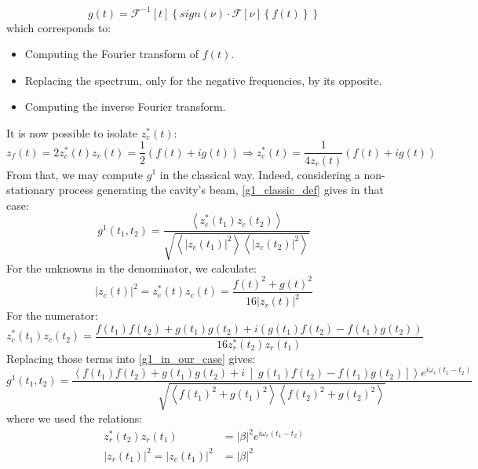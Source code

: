 \documentclass[11pt]{report}
\begin{document}
\begin{equation}
g(t) = \mathscr{F}^{-1}[t]\left\lbrace sign(\nu) \cdot \mathscr{F}[\nu]\left\lbrace f(t) \right\rbrace \right\rbrace
\end{equation}
which corresponds to:
\begin{itemize}
	\item Computing the Fourier transform of $f(t)$.
	\item Replacing the spectrum, only for the negative frequencies, by its opposite.
	\item Computing the inverse Fourier transform.
\end{itemize}
It is now possible to isolate $z_c^*(t)$:
\begin{equation}
\label{zf_def}
z_f(t) = 2z_c^*(t)z_r(t) = \frac{1}{2} (f(t) + ig(t)) \Rightarrow z_c^*(t) = \frac{1}{4z_r(t)} (f(t) + ig(t))
\end{equation}
From that, we may compute $g^1$ in the classical way. Indeed, considering a non-stationary process generating the cavity's beam, \eqref{g1_classic_def} gives in that case:
\begin{equation}
\label{g1_in_our_case}
g^1(t_1,t_2) = \frac{\left\langle z_c^*(t_1)z_c(t_2) \right\rangle}{\sqrt{\left\langle \vert z_c(t_1) \vert ^2 \right\rangle \left\langle \vert z_c(t_2) \vert ^2 \right\rangle}}
\end{equation}
For the unknowns in the denominator, we calculate:
\begin{equation}
\vert z_c(t) \vert ^2 = z_c^*(t)z_c(t) = \frac{f(t)^2 + g(t)^2}{16\vert z_r(t) \vert^2}
\end{equation}
For the numerator:
\begin{equation}
z_c^*(t_1)z_c(t_2) = \frac{f(t_1)f(t_2) + g(t_1)g(t_2) + i (g(t_1)f(t_2) - f(t_1)g(t_2))}{16z_r^*(t_2)z_r(t_1)}
\end{equation}
Replacing those terms into \eqref{g1_in_our_case} gives:
\begin{equation}
g^1(t_1,t_2) = \frac{\left\langle f(t_1)f(t_2) + g(t_1)g(t_2) + i \left]g(t_1)f(t_2) - f(t_1)g(t_2)\right] \right\rangle e^{i\omega_r(t_1 - t_2)}}{\sqrt{\left\langle f(t_1)^2 + g(t_1)^2 \right\rangle \left\langle f(t_2)^2 + g(t_2)^2 \right\rangle}}
\end{equation}
where we used the relations:
\begin{align}
z_r^*(t_2)z_r(t_1) &= \vert \beta \vert^2 e^{i\omega_r(t_1 - t_2)}\\
\vert z_r(t_1) \vert^2 = \vert z_c(t_1) \vert^2 &= \vert \beta \vert^2
\end{align}
\end{document}
